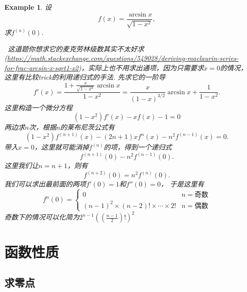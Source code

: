 \documentclass{article}
\newtheorem{example}[theorem]{Example}
\newcommand{\hints}{{\color{blue} \text{hints}}}
\begin{document}
\begin{example}
\rm 设
$$
f(x) = \frac{\arcsin x}{\sqrt{1-x^2}},
$$
求$f^{(n)}(0)$.

\hints\ 这道题你想求它的麦克劳林级数其实不太好求(\url{https://math.stackexchange.com/questions/549028/deriving-maclaurin-series-for-frac-arcsin-x-sqrt1-x2})，实际上也不用求出通项，因为只需要求$x=0$的情况，这里有比较trick的利用递归式的手法. 先求它的一阶导
$$
f'(x) = \frac{1 + \frac{x}{\sqrt{1-x^2}}\arcsin x}{1-x^2} = \frac{x}{(1-x)^{3/2}}\arcsin x + \frac{1}{1-x^2}.  
$$
这里构造一个微分方程
$$
(1-x^2)f'(x)-xf(x)-1 = 0
$$ 
两边求$n$次，根据$n$的莱布尼茨公式有
$$
(1-x^2)f^{(n+1)}(x) - (2n+1)xf^{n}(x)-n^2f^{(n-1)}(x) = 0. 
$$
带入$x=0$，这里就可能消掉$f^{(n)}$的项，得到一个递归式
$$
f^{(n+1)}(0) - n^2f^{(n-1)}(0). 
$$
这里我们让$n=n+1$，则有
$$
f^{(n+2)}(0) =  n^2f^{(n)}(0). 
$$
我们可以求出最前面的两项$f'(0) = 1$和$f''(0) = 0$， 于是这里有
$$
f^{n}(0) = \left\{ \begin{array}{ll}
0 & n=\text{奇数} \\
(n-1)^2\times(n-2)!\times\cdots\times 2! &   n=\text{偶数}
\end{array} \right.
$$
奇数下的情况可以化简为$2^{n-1}((\frac{n-1}{2})!)^2$
\end{example}

\newpage
\section{函数性质}

\subsection{求零点}
\end{document}
